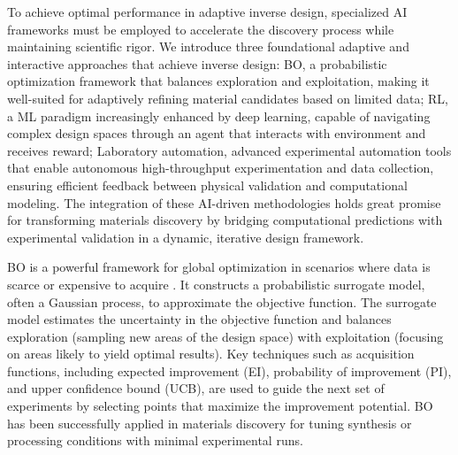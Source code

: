 \documentclass[fleqn,10pt]{wlscirep}
\begin{document}
To achieve optimal performance in adaptive inverse design, specialized AI frameworks must be employed to accelerate the discovery process while maintaining scientific rigor. We introduce three foundational adaptive and interactive approaches that achieve inverse design: BO, a probabilistic optimization framework that balances exploration and exploitation, making it well-suited for adaptively refining material candidates based on limited data; RL, a ML paradigm increasingly enhanced by deep learning, capable of navigating complex design spaces through an agent that interacts with environment and receives reward; Laboratory automation, advanced experimental automation tools that enable autonomous high-throughput experimentation and data collection, ensuring efficient feedback between physical validation and computational modeling. The integration of these AI-driven methodologies holds great promise for transforming materials discovery by bridging computational predictions with experimental validation in a dynamic, iterative design framework.

BO is a powerful framework for global optimization in scenarios where data is scarce or expensive to acquire \cite{shahriari2015taking}. It constructs a probabilistic surrogate model, often a Gaussian process, to approximate the objective function. The surrogate model estimates the uncertainty in the objective function and balances exploration (sampling new areas of the design space) with exploitation (focusing on areas likely to yield optimal results). Key techniques such as acquisition functions, including expected improvement (EI), probability of improvement (PI), and upper confidence bound (UCB), are used to guide the next set of experiments by selecting points that maximize the improvement potential. BO has been successfully applied in materials discovery for tuning synthesis or processing conditions with minimal experimental runs.
\end{document}
